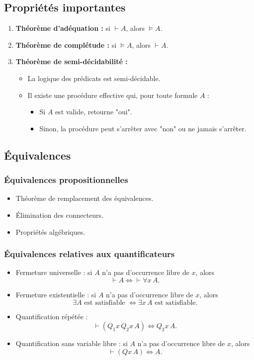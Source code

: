 \documentclass{article}
\begin{document}
\subsection*{Propriétés importantes}
\begin{enumerate}
    \item \textbf{Théorème d'adéquation :} si $\vdash A$, alors $\vDash A$.
    \item \textbf{Théorème de complétude :} si $\vDash A$, alors $\vdash A$.
    \item \textbf{Théorème de semi-décidabilité :} 
    \begin{itemize}
        \item La logique des prédicats est semi-décidable.
        \item Il existe une procédure effective qui, pour toute formule $A$ :
        \begin{itemize}
            \item Si $A$ est valide, retourne "oui".
            \item Sinon, la procédure peut s'arrêter avec "non" ou ne jamais s'arrêter.
        \end{itemize}
    \end{itemize}
\end{enumerate}

\subsection*{Équivalences}
\subsubsection*{Équivalences propositionnelles}
\begin{itemize}
    \item Théorème de remplacement des équivalences.
    \item Élimination des connecteurs.
    \item Propriétés algébriques.
\end{itemize}

\subsubsection*{Équivalences relatives aux quantificateurs}
\begin{itemize}
    \item Fermeture universelle : si $A$ n'a pas d'occurrence libre de $x$, alors 
    \[
    \vdash A \iff \vdash \forall x \, A.
    \]
    \item Fermeture existentielle : si $A$ n'a pas d'occurrence libre de $x$, alors 
    \[
    \exists A \text{ est satisfiable } \iff \exists x \, A \text{ est satisfiable.}
    \]
    \item Quantification répétée : 
    \[
    \vdash (Q_1 x \, Q_2 x \, A) \iff Q_2 x \, A.
    \]
    \item Quantification sans variable libre : si $A$ n'a pas d'occurrence libre de $x$, alors 
    \[
    \vdash (Q x \, A) \iff A.
    \]
\end{itemize}
\end{document}

